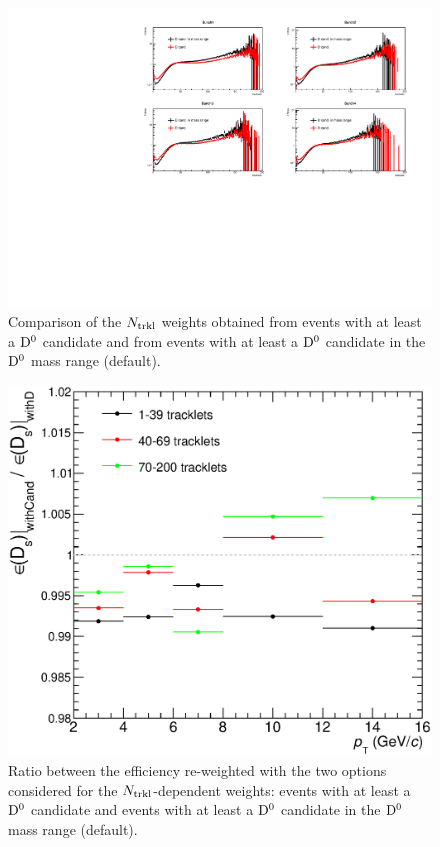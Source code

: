 \begin{figure}[htpb]
\centering
 \includegraphics[width=.9\textwidth]{FigCap6/NtrkWeightsD-Cand_4Bunches_DsDplusVsmult.pdf}
 \caption{Comparison of the $N_{\rm trkl}$ weights obtained from events with at least a ${\rm D^0}$ candidate and from events with at least a ${\rm D^0}$ candidate in the ${\rm D^0}$ mass range (default).}
 \label{fig:NtrklWeights_EvWithD_EvWithCand_Comparison}
\end{figure}


\begin{figure}[htpb]
\centering
 \includegraphics[width=.49\textwidth]{FigCap6/SystOnDWeightsWithCandVsWithD_Dsonly.eps}
 \caption{Ratio between the efficiency re-weighted with the two options considered for the $N_{\rm trkl}$-dependent weights: events with 
 at least a ${\rm D^0}$ candidate and events with at least a ${\rm D^0}$ candidate in the ${\rm D^0}$ mass range (default).}
 \label{fig:DsDplusVsMult_SystEffWeights}
\end{figure}




